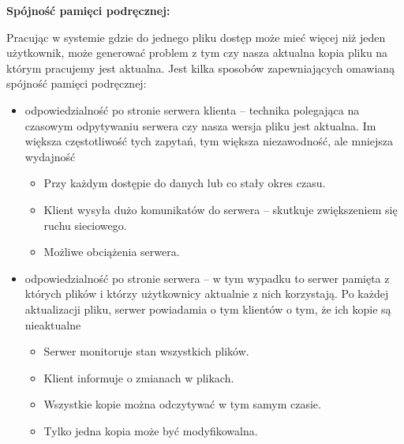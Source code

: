 \textbf{Spójność pamięci podręcznej:}

Pracując w systemie gdzie do jednego pliku dostęp może mieć więcej niż jeden użytkownik, może generować problem z tym czy nasza aktualna kopia pliku na którym pracujemy jest aktualna. Jest kilka sposobów zapewniających omawianą spójność pamięci podręcznej:

\begin{itemize}
	\item odpowiedzialność po stronie serwera klienta – technika polegająca na czasowym odpytywaniu serwera czy nasza wersja pliku jest aktualna. Im większa częstotliwość tych zapytań, tym większa niezawodność, ale mniejsza wydajność
	\begin{itemize}
		\item Przy każdym dostępie do danych lub co stały okres czasu.
		\item Klient wysyła dużo komunikatów do serwera -- skutkuje zwiększeniem się ruchu sieciowego.
		\item Możliwe obciążenia serwera.
	\end{itemize}
	\item odpowiedzialność po stronie serwera – w tym wypadku to serwer pamięta z których plików i którzy użytkownicy aktualnie z nich korzystają. Po każdej aktualizacji pliku, serwer powiadamia o tym klientów o tym, że ich kopie są nieaktualne
	\begin{itemize}
		\item Serwer monitoruje stan wszystkich plików.
		\item Klient informuje o zmianach w plikach.
		\item Wszystkie kopie można odczytywać w tym samym czasie.
		\item Tylko jedna kopia może być modyfikowalna.
	\end{itemize}
\end{itemize}
